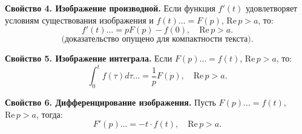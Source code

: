 {\textbf{Свойство 4. Изображение производной.}  
Если функция $f'(t)$ удовлетворяет условиям существования изображения и $f(t) \dots = F(p)$, $\mathrm{Re}\,p > a$,  то:
\[
f'(t) \dots = pF(p) - f(0), \quad \mathrm{Re}\,p > a.
\]
\[
\text{(доказательство опущено для компактности текста).}
\]

\textbf{Свойство 5. Изображение интеграла.}  
Если $F(p) \dots = f(t)$, $\mathrm{Re}\,p > a$, то:
\[
\int_{0}^{t} f(\tau) d\tau \dots = \frac{1}{p} F(p), \quad \mathrm{Re}\,p > a. \tag{4.32}
\]



\textbf{Свойство 6. Дифференцирование изображения.}  
Пусть $F(p) \dots = f(t)$, $\mathrm{Re}\,p > a$, тогда:
\[
F'(p) \dots = -t \cdot f(t), \quad \mathrm{Re}\,p > a. \tag{4.33}
\]
}



